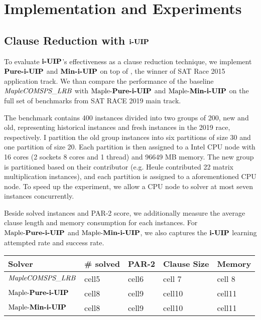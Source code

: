 \section{Implementation and Experiments}

\subsection{Clause Reduction with $\textbf{i-UIP}$}
To evaluate $\textbf{i-UIP}$'s effectiveness as a clause reduction technique, we implement  $\textbf{Pure-i-UIP}$ and $\textbf{Min-i-UIP}$  on top of \text{\MapleBase} \cite{}, the winner of SAT Race 2015 application track.  We than compare the performance of the baseline $\textit{MapleCOMSPS\_LRB}$ with $\text{Maple-\textbf{Pure-i-UIP}}$ and $\text{Maple-\textbf{Min-i-UIP}}$ on the full set of benchmarks from SAT RACE 2019 main track.

The benchmark contains 400 instances divided into two groups of 200, new and old, representing historical instances and fresh instances in the 2019 race, respectively. I partition the old group instances into six partitions of size 30 and one partition of size 20. Each partition is then assigned to a Intel CPU node with 16 cores (2 sockets 8 cores  and  1 thread) and 96649 MB memory. The new group is partitioned based on their contributor (e.g. Heule contributed 22 matrix multiplication instances), and each partition is assigned to a aforementioned CPU node. To speed up the experiment, we allow a CPU node to solver at most seven instances concurrently. 

Beside solved instances and PAR-2 score, we additionally measure the average clause length and memory consumption for each instances. For $\text{Maple-\textbf{Pure-i-UIP}}$  and $\text{Maple-\textbf{Min-i-UIP}}$, we also captures the $\textbf{i-UIP}$ learning attempted rate and success rate.





\begin{center}
\begin{tabular}{ | m{3.5cm} | m{2cm}| m{2cm} | m{2cm} | m{2cm} | } 
\hline
Solver & \# solved & PAR-2 & Clause Size & Memory \\ 
\hline
$\textit{MapleCOMSPS\_LRB}$ & cell5 & cell6 & cell 7 & cell 8 \\ 
\hline
$\text{Maple-\textbf{Pure-i-UIP}}$ & cell8 & cell9 & cell10 & cell11\\ 
\hline
$\text{Maple-\textbf{Min-i-UIP}}$ & cell8 & cell9 & cell10 & cell11\\ 
\hline
\end{tabular}
\end{center}

